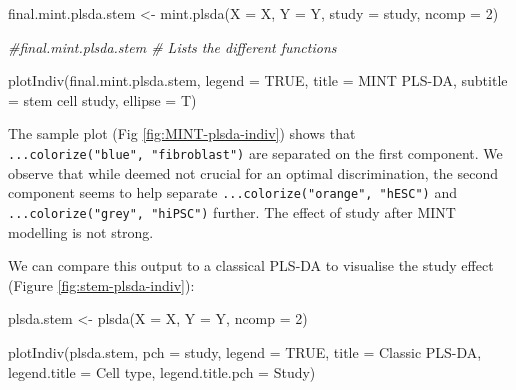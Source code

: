 \documentclass[
]{book}
\newenvironment{Shaded}{\begin{snugshade}}{\end{snugshade}}
\newcommand{\AttributeTok}[1]{\textcolor[rgb]{0.77,0.63,0.00}{#1}}
\newcommand{\CommentTok}[1]{\textcolor[rgb]{0.56,0.35,0.01}{\textit{#1}}}
\newcommand{\ConstantTok}[1]{\textcolor[rgb]{0.00,0.00,0.00}{#1}}
\newcommand{\DecValTok}[1]{\textcolor[rgb]{0.00,0.00,0.81}{#1}}
\newcommand{\FunctionTok}[1]{\textcolor[rgb]{0.00,0.00,0.00}{#1}}
\newcommand{\NormalTok}[1]{#1}
\newcommand{\OtherTok}[1]{\textcolor[rgb]{0.56,0.35,0.01}{#1}}
\newcommand{\StringTok}[1]{\textcolor[rgb]{0.31,0.60,0.02}{#1}}
\begin{document}
\begin{Shaded}
\begin{Highlighting}[]
\NormalTok{final.mint.plsda.stem }\OtherTok{\textless{}{-}} \FunctionTok{mint.plsda}\NormalTok{(}\AttributeTok{X =}\NormalTok{ X, }\AttributeTok{Y =}\NormalTok{ Y, }\AttributeTok{study =}\NormalTok{ study, }\AttributeTok{ncomp =} \DecValTok{2}\NormalTok{)}

\CommentTok{\#final.mint.plsda.stem \# Lists the different functions}

\FunctionTok{plotIndiv}\NormalTok{(final.mint.plsda.stem, }\AttributeTok{legend =} \ConstantTok{TRUE}\NormalTok{, }\AttributeTok{title =} \StringTok{\textquotesingle{}MINT PLS{-}DA\textquotesingle{}}\NormalTok{, }
          \AttributeTok{subtitle =} \StringTok{\textquotesingle{}stem cell study\textquotesingle{}}\NormalTok{, }\AttributeTok{ellipse =}\NormalTok{ T)}
\end{Highlighting}
\end{Shaded}



The sample plot (Fig \ref{fig:MINT-plsda-indiv}) shows that \texttt{...colorize("blue",\ "fibroblast")} are separated on the first component. We observe that while deemed not crucial for an optimal discrimination, the second component seems to help separate \texttt{...colorize("orange",\ "hESC")} and \texttt{...colorize("grey",\ "hiPSC")} further. The effect of study after MINT modelling is not strong.

We can compare this output to a classical PLS-DA to visualise the study effect (Figure \ref{fig:stem-plsda-indiv}):

\begin{Shaded}
\begin{Highlighting}[]
\NormalTok{plsda.stem }\OtherTok{\textless{}{-}} \FunctionTok{plsda}\NormalTok{(}\AttributeTok{X =}\NormalTok{ X, }\AttributeTok{Y =}\NormalTok{ Y, }\AttributeTok{ncomp =} \DecValTok{2}\NormalTok{)}

\FunctionTok{plotIndiv}\NormalTok{(plsda.stem, }\AttributeTok{pch =}\NormalTok{ study,}
          \AttributeTok{legend =} \ConstantTok{TRUE}\NormalTok{, }\AttributeTok{title =} \StringTok{\textquotesingle{}Classic PLS{-}DA\textquotesingle{}}\NormalTok{,}
          \AttributeTok{legend.title =} \StringTok{\textquotesingle{}Cell type\textquotesingle{}}\NormalTok{, }\AttributeTok{legend.title.pch =} \StringTok{\textquotesingle{}Study\textquotesingle{}}\NormalTok{)}
\end{Highlighting}
\end{Shaded}
\end{document}
